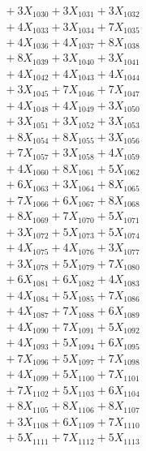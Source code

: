 \documentclass[a4paper,10pt]{article}
\begin{document}
{\begin{align}
&\;  + 3 X_{1030} + 3 X_{1031} + 3 X_{1032} \\[0.3ex]
&\;  + 4 X_{1033} + 3 X_{1034} + 7 X_{1035} \\[0.3ex]
&\;  + 4 X_{1036} + 4 X_{1037} + 8 X_{1038} \\[0.3ex]
&\;  + 8 X_{1039} + 3 X_{1040} + 3 X_{1041} \\[0.3ex]
&\;  + 4 X_{1042} + 4 X_{1043} + 4 X_{1044} \\[0.3ex]
&\;  + 3 X_{1045} + 7 X_{1046} + 7 X_{1047} \\[0.3ex]
&\;  + 4 X_{1048} + 4 X_{1049} + 3 X_{1050} \\[0.3ex]
&\;  + 3 X_{1051} + 3 X_{1052} + 3 X_{1053} \\[0.3ex]
&\;  + 8 X_{1054} + 8 X_{1055} + 3 X_{1056} \\[0.3ex]
&\;  + 7 X_{1057} + 3 X_{1058} + 4 X_{1059} \\[0.5ex]\allowbreak
&\;  + 4 X_{1060} + 8 X_{1061} + 5 X_{1062} \\[0.3ex]
&\;  + 6 X_{1063} + 3 X_{1064} + 8 X_{1065} \\[0.3ex]
&\;  + 7 X_{1066} + 6 X_{1067} + 8 X_{1068} \\[0.3ex]
&\;  + 8 X_{1069} + 7 X_{1070} + 5 X_{1071} \\[0.3ex]
&\;  + 3 X_{1072} + 5 X_{1073} + 5 X_{1074} \\[0.3ex]
&\;  + 4 X_{1075} + 4 X_{1076} + 3 X_{1077} \\[0.3ex]
&\;  + 3 X_{1078} + 5 X_{1079} + 7 X_{1080} \\[0.3ex]
&\;  + 6 X_{1081} + 6 X_{1082} + 4 X_{1083} \\[0.3ex]
&\;  + 4 X_{1084} + 5 X_{1085} + 7 X_{1086} \\[0.3ex]
&\;  + 4 X_{1087} + 7 X_{1088} + 6 X_{1089} \\[0.5ex]\allowbreak
&\;  + 4 X_{1090} + 7 X_{1091} + 5 X_{1092} \\[0.3ex]
&\;  + 4 X_{1093} + 5 X_{1094} + 6 X_{1095} \\[0.3ex]
&\;  + 7 X_{1096} + 5 X_{1097} + 7 X_{1098} \\[0.3ex]
&\;  + 4 X_{1099} + 5 X_{1100} + 7 X_{1101} \\[0.3ex]
&\;  + 7 X_{1102} + 5 X_{1103} + 6 X_{1104} \\[0.3ex]
&\;  + 8 X_{1105} + 8 X_{1106} + 8 X_{1107} \\[0.3ex]
&\;  + 3 X_{1108} + 6 X_{1109} + 7 X_{1110} \\[0.3ex]
&\;  + 5 X_{1111} + 7 X_{1112} + 5 X_{1113} \\[0.3ex]

\end{align}}
\end{document}
